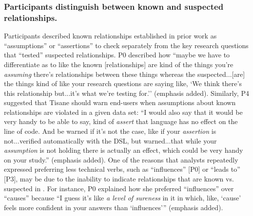 \subsubsection{Participants distinguish between known and suspected relationships.}
Participants described known relationships established in prior work as
``assumptions'' or ``assertions'' to check separately from the key research
questions that ``tested'' suspected relationships. P0 described how ``maybe we
have to differentiate as to like the known [relationships] are kind of the
things you're \textit{assuming} there's relationships between these things
whereas the suspected...[are] the things kind of like your research questions
are saying like, `We think there's this relationship but...it's what we're
testing for.'' (emphasis added). Similarly, P4 suggested that Tisane should warn
end-users when assumptions about known relationships are violated in a given
data set: ``I would also say that it would be very handy to be able to say, kind
of \textit{assert} that language has no effect on the line of code. And be
warned if it's not the case, like if your \textit{assertion} is not...verified
automatically with the DSL, but warned...that while your \textit{assumption} is
not holding there is actually an effect, which could be very handy on your
study.'' (emphasis added). One of the reasons that analysts repeatedly
expressed preferring less technical verbs, such as ``influences'' [P0] or
``leads to'' [P3], may be due to the inability to indicate relationships that
are known vs. suspected in \tisane. For instance, P0 explained how she preferred
``influences'' over ``causes'' because ``I guess it's like \textit{a level of
sureness} in it in which, like, `cause' feels more confident in your answers
than `influences''' (emphasis added).


\begin{comment}
\subsubsection{More expressivity for specifying study designs/experimental design}
**keep short**
Additional observations about expressing study design
More future work for how to express study designs

TODO: Participant as a separate construct
\end{comment}

